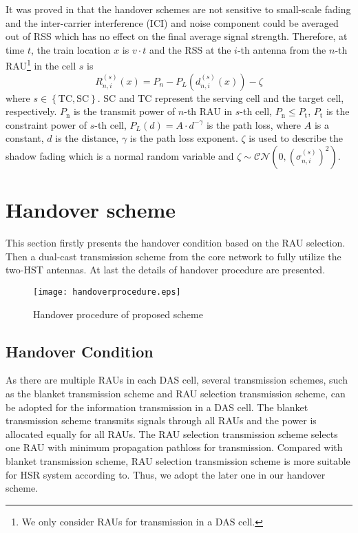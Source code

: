 \documentclass[a4paper,twocolumn,10pt]{IEEEtran}
\newcommand{\picspace}{{\vspace{-0.1 in}}}
\begin{document}
It was proved in \cite{Seamless} that the handover schemes are not sensitive to small-scale fading and the inter-carrier interference (ICI) and noise component could be averaged out of RSS which has no effect on the final average signal strength.  Therefore, at time $t$, the train location $x$ is $v \cdot t$ and the RSS at the $i$-th antenna from the $n$-th RAU\footnote{We only consider RAUs for transmission in a DAS cell.} in the cell $s$ is
\begin{equation}
R_{n,i}^{\left( s \right)}\left( x \right) = {P_n} - {P_L}\left( d_{n,i}^{\left( s \right)}\left(x\right) \right) - \zeta
\label{AAA}
\end{equation}
where $s \in \left\{ {\textrm{TC},\textrm{SC}} \right\}$. $\textrm{SC}$ and $\textrm{TC}$ represent the serving cell and the target cell, respectively. $P_\textrm{n} $ is the transmit power of $n$-th RAU in $s$-th cell, $P_\textrm{n} \le P_\textrm{t}$, $P_\textrm{t}$ is the constraint power of $s$-th cell, $P_L\left(d \right)=A \cdot d^{-\gamma} $ is the path loss, where $A$ is a constant, $d$ is the distance, $\gamma$ is the path loss exponent. $\zeta$ is used to describe the shadow fading which is a normal random variable and $\zeta \sim \mathcal{CN}(0,(\sigma_{n,i}^{( s )})^2)$.


\section{Handover scheme}

This section firstly presents the handover condition based on the RAU selection. Then a dual-cast transmission scheme from the core network to fully utilize the two-HST antennas. At last the details of handover procedure are presented.

\begin{figure}
\centering
\texttt{[image: handoverprocedure.eps]}
\caption{Handover procedure of proposed scheme}\picspace
\label{procedure}
\end{figure}
\subsection{Handover Condition}
As there are multiple RAUs in each DAS cell, several transmission schemes, such as the blanket transmission scheme and RAU selection transmission scheme\textcolor[rgb]{0,0,0}{\cite{RAU}}, can be adopted for the information transmission in a DAS cell. The blanket transmission scheme transmits signals through all RAUs and the power is allocated equally for all RAUs. The RAU selection transmission scheme selects one RAU with minimum propagation pathloss for transmission. Compared with blanket transmission scheme, RAU selection transmission scheme is more suitable for HSR system according to\textcolor[rgb]{0,0,0}{\cite{RAU2}}. Thus, we adopt the later one in our handover scheme.
\end{document}
